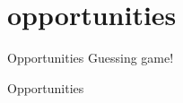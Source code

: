 \section{opportunities}

\begin{frame}{Opportunities}
Guessing game!
\end{frame}

\begin{frame}{Opportunities}
\end{frame}
